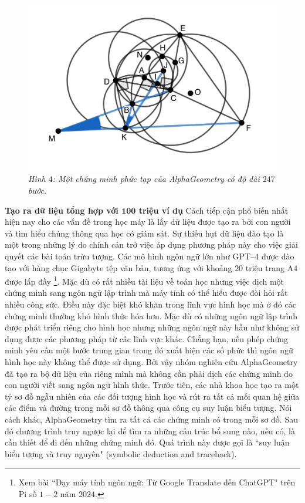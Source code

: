 \begin{multicols}{2}
\begin{figure}[H]
		\includegraphics[width= 1\linewidth]{geometry.jpg}
		\caption{\small\textit{\color{timhieukhoahoc}Hình $4$: Một chứng minh phức tạp của AlphaGeometry có độ dài $247$ bước.}}
		\vspace*{-10pt}
	\end{figure}
	\textbf{\color{timhieukhoahoc}Tạo ra dữ liệu tổng hợp với $\pmb{100}$ triệu ví dụ}
	\vskip 0.1cm
	Cách tiếp cận phổ biến nhất hiện nay cho các vấn đề trong học máy là lấy dữ liệu được tạo ra bởi con người và tìm hiểu chúng thông qua học có giám sát. Sự thiếu hụt dữ liệu đào tạo là một trong những lý do chính cản trở việc áp dụng phương pháp này cho việc giải quyết các bài toán trừu tượng.
	\vskip 0.1cm
	Các mô hình ngôn ngữ lớn như GPT--$4$ được đào tạo với hàng chục Gigabyte tệp văn bản, tương ứng với khoảng $20$ triệu trang A$4$ được lấp đầy \footnote[3]{\color{timhieukhoahoc}Xem bài ``Dạy máy tính ngôn ngữ: Từ Google Translate đến ChatGPT" trên Pi số $1-2$ năm $2024$.}. Mặc dù có rất nhiều tài liệu về toán học nhưng việc dịch một chứng minh sang ngôn ngữ lập trình mà máy tính có thể hiểu được đòi hỏi rất nhiều công sức. Điều này đặc biệt khó khăn trong lĩnh vực hình học mà ở đó các chứng minh thường khó hình thức hóa hơn. Mặc dù có những ngôn ngữ lập trình được phát triển riêng cho hình học nhưng những ngôn ngữ này hầu như không sử dụng được các phương pháp từ các lĩnh vực khác. Chẳng hạn, nếu phép chứng minh yêu cầu một bước trung gian trong đó xuất hiện các số phức thì ngôn ngữ hình học này không thể được sử dụng. Bởi vậy nhóm nghiên cứu AlphaGeometry đã tạo ra bộ dữ liệu của riêng mình mà không cần phải dịch các chứng minh do con người viết sang ngôn ngữ hình thức.
	\vskip 0.1cm
	Trước tiên, các nhà khoa học tạo ra một tỷ sơ đồ ngẫu nhiên của các đối tượng hình học và rút ra tất cả mối quan hệ giữa các điểm và đường trong mỗi sơ đồ thông qua công cụ suy luận biểu tượng. Nói cách khác, AlphaGeometry tìm ra tất cả các chứng minh có trong mỗi sơ đồ. Sau đó chương trình truy ngược lại để tìm ra những cấu trúc bổ sung nào, nếu có, là cần thiết để đi đến những chứng minh đó. Quá trình này được gọi là ``suy luận biểu tượng và truy nguyên" (symbolic deduction and traceback).

\end{multicols}
